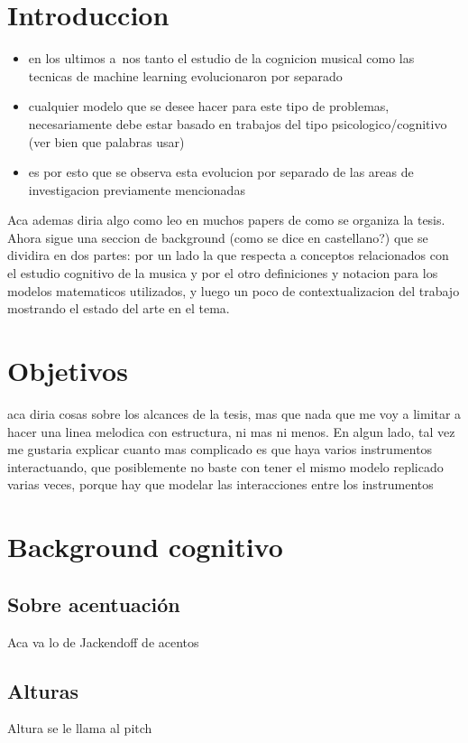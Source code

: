 \documentclass[a4paper,11pt]{article}
\begin{document}
\tableofcontents

\section{Introduccion}
\begin{itemize}
 \item en los ultimos a~nos tanto el estudio de la cognicion musical como las tecnicas de machine learning evolucionaron por 
 separado
 \item cualquier modelo que se desee hacer para este tipo de problemas, necesariamente debe estar basado en trabajos del tipo 
 psicologico/cognitivo (ver bien que palabras usar)
 \item es por esto que se observa esta evolucion por separado de las areas de investigacion previamente mencionadas
\end{itemize}

Aca ademas diria algo como leo en muchos papers de como se organiza la tesis. Ahora sigue una seccion de background (como se dice en castellano?) que se dividira en dos partes: por un lado la que respecta a conceptos relacionados con el estudio cognitivo de la musica y por el otro definiciones y notacion para los modelos matematicos utilizados, y luego un poco de contextualizacion
del trabajo mostrando el estado del arte en el tema.

\section{Objetivos}
aca diria cosas sobre los alcances de la tesis, mas que nada que me voy a limitar a hacer una linea melodica con estructura, 
ni mas ni menos. En algun lado, tal vez me gustaria explicar cuanto mas complicado es que haya varios instrumentos interactuando,
que posiblemente no baste con tener el mismo modelo replicado varias veces, porque hay que modelar las interacciones entre los 
instrumentos

\section{Background cognitivo}
\subsection{Sobre acentuaci\'on}
Aca va lo de Jackendoff de acentos

\subsection{Alturas}
Altura se le llama al pitch
\end{document}
